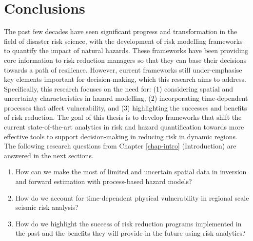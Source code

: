 \setcounter{chapter}{4}
\chapter[Conclusions]{Conclusions}\label{chap-conc}

The past few decades have seen significant progress and transformation in the field of disaster risk science, with the development of risk modelling frameworks to quantify the impact of natural hazards. These frameworks have been providing core information to risk reduction managers so that they can base their decisions towards a path of resilience. However, current frameworks still under-emphasise key elements important for decision-making, which this research aims to address. Specifically, this research focuses on the need for: (1) considering spatial and uncertainty characteristics in hazard modelling, (2) incorporating time-dependent processes that affect vulnerability, and (3) highlighting the successes and benefits of risk reduction. The goal of this thesis is to develop frameworks that shift the current state-of-the-art analytics in risk and hazard quantification towards more effective tools to support decision-making in reducing risk in dynamic regions. The following research questions from Chapter \ref{chap-intro} (Introduction) are answered in the next sections.
    \begin{enumerate}
    \setlength\itemsep{-0.45em}
    \item How can we make the most of limited and uncertain spatial data in inversion and forward estimation with process-based hazard models? 
    \item How do we account for time-dependent physical vulnerability in regional scale seismic risk analysis?
    \item How do we highlight the success of risk reduction programs implemented in the past and the benefits they will provide in the future using risk analytics?
    \end{enumerate}

